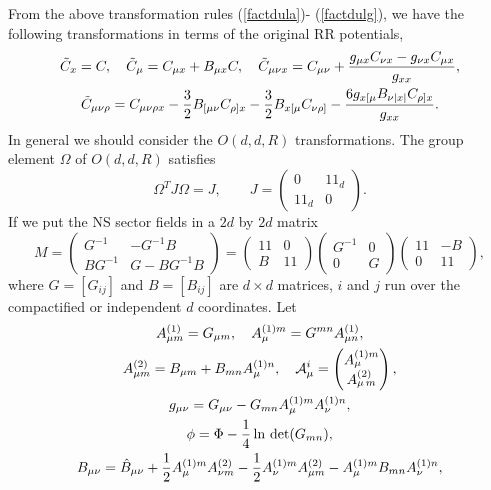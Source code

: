 \documentclass[a4paper,12pt]{article}
\begin{document}
From the above transformation rules (\ref{factdula})-
(\ref{factdulg}), we have the following transformations 
in terms of the original RR potentials,
\begin{subequations}
\begin{gather}
\label{rra}
{\tilde C}_x=C,\quad 
{\tilde C}_\mu=C_{\mu x}+B_{\mu x}C,\quad
{\tilde C}_{\mu\nu x}=C_{\mu\nu}+{g_{\mu x}C_{\nu x}
-g_{\nu x}C_{\mu x}\over g_{xx}},\\
\label{rrb}
{\tilde C}_{\mu\nu\rho}=C_{\mu\nu\rho x}-{3\over 2}
B_{[\mu\nu}C_{\rho] x}-{3\over 2}B_{x[\mu}C_{\nu\rho]}
-{6g_{x[\mu}B_{\nu|x|}C_{\rho]x}\over g_{xx}}.
\end{gather}
\end{subequations}
In general we should consider the 
$O(d,d,R)$ transformations. The group element
$\Omega$ of $O(d,d,R)$ satisfies 
\begin{equation}
\label{4dL}
\Omega^T J \Omega = J ,\qquad 
J =\begin{pmatrix}
0 & 1\!\!1_d\\
1\!\!1_d & 0
\end{pmatrix}.
\end{equation}
If we put the NS sector fields in a $2d$ by $2d$ matrix
\begin{equation}
\label{modulthree}
M=\begin{pmatrix}
G^{-1} & -G^{-1}B \\
B G^{-1} & G -B G^{-1} B
\end{pmatrix}=\begin{pmatrix}
1\!\!1 &0\\
B&1\!\!1
\end{pmatrix}
\begin{pmatrix}
G^{-1}&0\\
0&G
\end{pmatrix}
\begin{pmatrix}
1\!\!1 &-B\\
0&1\!\!1
\end{pmatrix},
\end{equation}
where $G=[G_{ij}]$ and $B=[B_{ij}]$ are $d\times d$ matrices,
$i$ and $j$ run over the compactified or independent
$d$ coordinates. Let
\begin{gather}
\label{defa}
A_{\mu m}^{(1)}=G_{\mu m},\quad A^{(1)m}_\mu=G^{mn} A_{\mu n}^{(1)},\\
\label{defb}
A^{(2)}_{\mu m} = B_{\mu m} + B_{m n}
A^{(1) n}_{\mu},\quad
{\cal A}^i_{\mu}
=\begin{pmatrix} 
A^{(1)m}_{\mu}\\
A^{(2)}_{\mu\,m}
\end{pmatrix},\\
\label{defc}
g_{\mu\nu}=G_{\mu\nu}-G_{mn} A^{(1)m}_\mu A^{(1)n}_{\nu},\\
\label{defd}
\phi=\Phi-{1\over 4}\ln\, {\rm det}(G_{mn}),\\
\label{defe}
B_{\mu \nu} = \hat B_{\mu \nu} + {1 \over 2} A^{(1) m}_{\mu}
A^{(2)}_{\nu m} - {1 \over 2} A^{(1) m}_{\nu} A^{(2)}_{\mu
m} - A^{(1) m}_{\mu} B_{m n} A^{(1) n}_\nu,
\end{gather}
\end{document}
